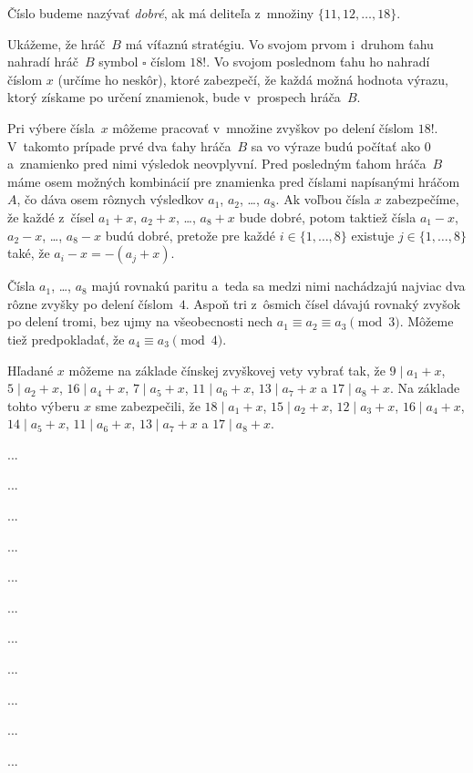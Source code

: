 {%
Číslo budeme nazývať {\it dobré}, ak má deliteľa z~množiny $\{ 11, 12, \dots, 18\}$.

Ukážeme, že hráč~$B$ má víťaznú stratégiu. Vo svojom prvom i~druhom ťahu nahradí hráč~$B$ symbol $\square$ číslom $18!$. Vo svojom poslednom ťahu ho nahradí číslom $x$ (určíme ho neskôr), ktoré zabezpečí, že každá možná hodnota výrazu, ktorý získame po určení znamienok, bude v~prospech hráča~$B$.

Pri výbere čísla~$x$ môžeme pracovať v~množine zvyškov po delení číslom $18!$. V~takomto prípade prvé dva ťahy hráča~$B$ sa vo výraze budú počítať ako $0$ a~znamienko pred nimi výsledok neovplyvní. Pred posledným ťahom hráča~$B$ máme osem možných kombinácií pre znamienka pred číslami napísanými hráčom~$A$, čo dáva osem rôznych výsledkov $a_1$, $a_2$, \dots, $a_8$. Ak voľbou čísla $x$ zabezpečíme, že každé z~čísel $a_1+x$, $a_2+x$, \dots, $a_8+x$ bude dobré, potom taktiež čísla $a_1-x$, $a_2-x$, \dots, $a_8-x$ budú dobré, pretože pre každé $i\in \{1,\dots, 8\}$ existuje $j\in \{1,\dots,8\}$ také, že $a_i - x = -(a_j+x)$.

Čísla $a_1$, \dots, $a_8$ majú rovnakú paritu a~teda sa medzi nimi nachádzajú najviac dva rôzne zvyšky po delení číslom~$4$. %
Aspoň tri z~ôsmich čísel dávajú rovnaký zvyšok po delení tromi, bez ujmy na všeobecnosti nech $a_1 \equiv a_2 \equiv a_3 \pmod{3}$. Môžeme tiež predpokladať, že $a_4 \equiv a_3 \pmod{4}$.

Hľadané $x$ môžeme na základe čínskej zvyškovej vety vybrať tak, že  $9 \mid a_1+x$, $5 \mid a_2+x$, $16 \mid a_4+x$, $7 \mid a_5+x$, $11 \mid a_6+x$, $13 \mid a_7+x$ a $17 \mid a_8 + x$.
Na základe tohto výberu $x$ sme zabezpečili, že
$18 \mid a_1+x$, $15 \mid a_2+x$, $12 \mid a_3+x$, $16 \mid a_4+x$, $14 \mid a_5+x$, $11 \mid a_6+x$, $13 \mid a_7+x$ a $17 \mid a_8 + x$.
}

{%
...}

{%
...}

{%
...}

{%
...}

{%
...}

{%
...}

{%
...}

{%
...}

{%
...}

{%
...}

{%
...}
